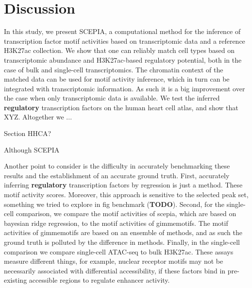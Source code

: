 \section{Discussion}

In this study, we present SCEPIA, a computational method for the inference of transcription factor motif activities based on transcriptomic data and a reference H3K27ac collection. We show that one can reliably match cell types based on transcriptomic abundance and H3K27ac-based regulatory potential\cite{Wang2016}, both in the case of bulk and single-cell transcriptomics. The chromatin context of the matched data can be used for motif activity inference, which in turn can be integrated with transcriptomic information. As such it is a big improvement over the case when only transcriptomic data is available. We test the inferred \textbf{regulatory} transcription factors on the human heart cell atlas, and show that XYZ. Altogether we ...

Section HHCA?

Although SCEPIA 

Another point to consider is the difficulty in accurately benchmarking these results and the establishment of an accurate ground truth. First, accurately inferring \textbf{regulatory} transcription factors by regression is just a method\cite{FANTOM2009,Balwierz2014,Madsen_2017}. These motif activity scores. Moreover, this approach is sensitive to the selected peak set, something we tried to explore in fig benchmark (\textbf{TODO}). Second, for the single-cell comparison, we compare the motif activities of scepia, which are based on bayesian ridge regression, to the motif activities of gimmemotifs\cite{Bruse_2018}. The motif activities of gimmemotifs are based on an ensemble of methods, and as such the ground truth is polluted by the difference in methods. Finally, in the single-cell comparison we compare single-cell ATAC-seq to bulk H3K27ac. These assays measure different things, for example, nuclear receptor motifs may not be necessarily associated with differential accessibility, if these factors bind in pre-existing accessible regions to regulate enhancer activity. 

